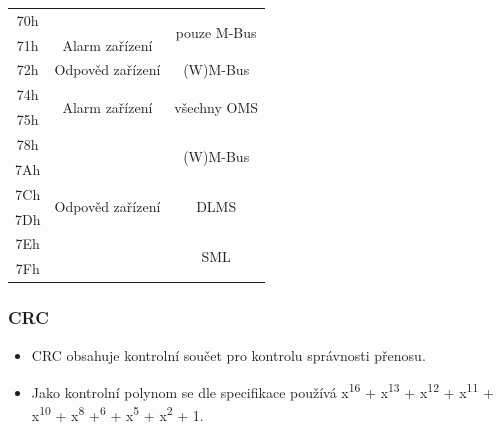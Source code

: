 \begin{table}[!ht]
{\begin{tabular}{|c|c|c|}
70h               &                        & \multirow{2}{*}{pouze M-Bus}                    \\ \cline{1-2}
71h               & Alarm zařízení                       &                    \\ \hline
72h               & Odpověd zařízení                     & (W)M-Bus                                              \\ \hline
74h               & \multirow{2}{*}{Alarm zařízení}                          & \multirow{2}{*}{všechny OMS}                                           \\ \cline{1-1}
75h               &                          &                                          \\ \hline
78h               & \multirow{6}{*}{Odpověd zařízení}                    & \multirow{2}{*}{(W)M-Bus}                            \\ \cline{1-1}
7Ah               &                      &                                             \\ \cline{1-1} \cline{3-3}
7Ch               &                    & \multirow{2}{*}{DLMS}                                          \\ \cline{1-1}
7Dh               &                     &                                         \\ \cline{1-1} \cline{3-3}
7Eh               &                     & \multirow{2}{*}{SML}                                           \\ \cline{1-1}
7Fh               &                     &                                            \\ \hline \hline
\end{tabular}}
\end{table}

\subsubsection{CRC}
\begin{itemize}
	\item CRC obsahuje kontrolní součet pro kontrolu správnosti přenosu. 
	\item Jako kontrolní polynom se dle specifikace používá x\textsuperscript{16} + x\textsuperscript{13} + x\textsuperscript{12} + x\textsuperscript{11} + x\textsuperscript{10} + x\textsuperscript{8} +\textsuperscript{6} + x\textsuperscript{5} + x\textsuperscript{2} + 1.
\end{itemize}

